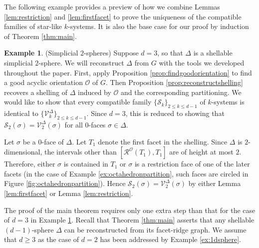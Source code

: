 \documentclass[11pt,twoside]{article}
\theoremstyle{definition}
\newtheorem{example}[theorem]{Example}
\newcommand{\cS}{\mathcal{S}}
\newcommand{\cO}{\mathcal{O}}
\newcommand{\cV}{\mathcal{V}}
\newcommand{\cR}{\mathcal{R}}
\begin{document}
The following example provides a preview of how we combine Lemmas \ref{lem:restriction} and \ref{lem:firstfacet} to prove the uniqueness of the compatible families of star-like $k$-systems. It is also the base case for our proof by induction of Theorem \ref{thm:main}.
\begin{example}\label{ex:2dsphere}(Simplicial $2$-spheres) Suppose $d = 3$, so that $\Delta$ is a shellable simplicial $2$-sphere. We will reconstruct $\Delta$ from $G$ with the tools we developed throughout the paper. First, apply Proposition \ref{prop:findgoodorientation} to find a good acyclic orientation $\cO$ of $G$. Then Proposition \ref{prop:reconstructshelling} recovers a shelling of $\Delta$ induced by $\cO$ and the corresponding partitioning. We would like to show that every compatible family $\{\cS_k\}_{2 \le k \le d-1}$ of $k$-systems is identical to  $\{\cV^\Delta_k\}_{2 \le k \le d-1}$. Since $d = 3$, this is reduced to showing that $\cS_2(\sigma) = \cV^\Delta_2(\sigma)$ for all $0$-faces $\sigma \in \Delta$. 

Let $\sigma$ be a $0$-face of $\Delta$. Let $T_1$ denote the first facet in the shelling. Since $\Delta$ is $2$-dimensional, the intervals other than $[\cR^\cO(T_1), T_1]$ are of height at most $2$. Therefore, either $\sigma$ is contained in $T_1$ or $\sigma$ is a restriction face of one of the later facets (in the case of Example \ref{ex:octahedronpartition}, such faces are circled in Figure \ref{fig:octahedronpartition}). Hence $\cS_2(\sigma) = \cV^\Delta_2(\sigma)$ by either Lemma \ref{lem:firstfacet} or Lemma \ref{lem:restriction}.
\end{example}

The proof of the main theorem requires only one extra step than that for the case of $d = 3$ in Example \ref{ex:2dsphere}. Recall that Theorem \ref{thm:main} asserts that any shellable $(d-1)$-sphere $\Delta$ can be reconstructed from its facet-ridge graph. We assume that $d \ge 3$ as the case of $d = 2$ has been addressed by Example \ref{ex:1dsphere}. 
\end{document}

